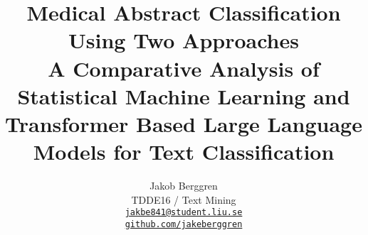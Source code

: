 \documentclass[11pt]{article}
\title{Medical Abstract Classification Using Two Approaches \\
       \normalsize A Comparative Analysis of Statistical Machine Learning and \\ Transformer Based Large Language Models for Text Classification}
\author{Jakob Berggren \\
  TDDE16 / Text Mining \\
  \href{mailto:jakbe841@student.liu.se}{\texttt{jakbe841@student.liu.se}} \\
  \href{https://github.com/jakeberggren}{\texttt{github.com/jakeberggren}}}
\begin{document}
\maketitle

\begin{abstract}

\end{abstract}













\end{document}
